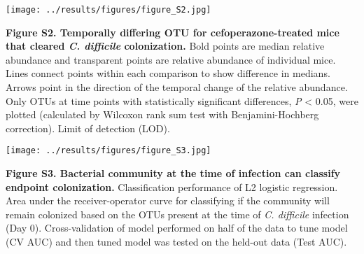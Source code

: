 \documentclass[11pt,]{article}
\begin{document}
\hfill\break

\texttt{[image: ../results/figures/figure\_S2.jpg]}

\textbf{Figure S2. Temporally differing OTU for cefoperazone-treated
mice that cleared \emph{C. difficile} colonization.} Bold points are
median relative abundance and transparent points are relative abundance
of individual mice. Lines connect points within each comparison to show
difference in medians. Arrows point in the direction of the temporal
change of the relative abundance. Only OTUs at time points with
statistically significant differences, \emph{P} \textless{} 0.05, were
plotted (calculated by Wilcoxon rank sum test with Benjamini-Hochberg
correction). Limit of detection (LOD).

\hfill\break

\texttt{[image: ../results/figures/figure\_S3.jpg]}

\textbf{Figure S3. Bacterial community at the time of infection can
classify endpoint colonization.} Classification performance of L2
logistic regression. Area under the receiver-operator curve for
classifying if the community will remain colonized based on the OTUs
present at the time of \emph{C. difficile} infection (Day 0).
Cross-validation of model performed on half of the data to tune model
(CV AUC) and then tuned model was tested on the held-out data (Test
AUC).
\end{document}

